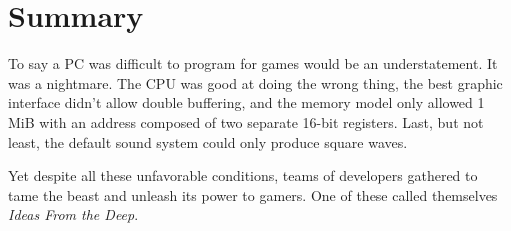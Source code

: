 \documentclass[book.tex]{subfiles}
\begin{document}
\section{Summary}
To say a PC was difficult to program for games would be an understatement. It was a nightmare. The CPU was good at doing the wrong thing, the best graphic interface didn't allow double buffering, and the memory model only allowed 1 MiB with an address composed of two separate 16-bit registers. Last, but not least, the default sound system could only produce square waves.\\
\par
Yet despite all these unfavorable conditions, teams of developers gathered to tame the beast and unleash its power to gamers. One of these called themselves \textit{Ideas From the Deep}.
\end{document}
